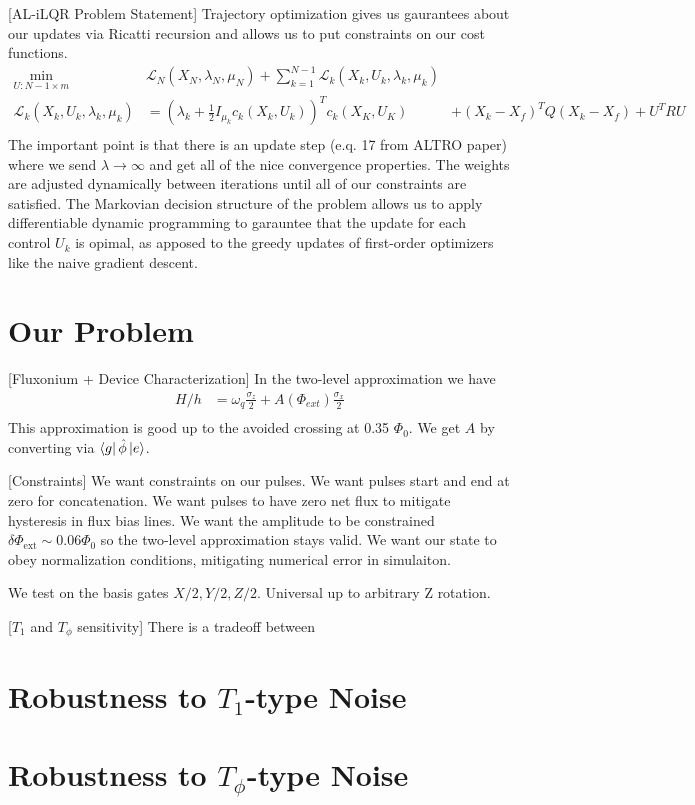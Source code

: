 \documentclass[
  amsfonts,
  amsmath,
  amssymb,
  aps,
  nobibnotes,
  prl,
  twocolumn,
]{revtex4-2}
\begin{document}
[AL-iLQR Problem Statement] Trajectory optimization gives us gaurantees
about our updates via Ricatti recursion
and allows us to put constraints on our cost functions.
\begin{align}
  \min_{U:N-1 \times m} &\mathcal{L}_{N}(X_{N}, \lambda_{N}, \mu_{N}) + \sum_{k = 1}^{N - 1} \mathcal{L}_{k}(X_{k}, U_{k}, \lambda_{k}, \mu_{k})\\
  \mathcal{L}_{k}(X_{k}, U_{k}, \lambda_{k}, \mu_{k}) &= (\lambda_{k} + \frac{1}{2}I_{\mu_{k}} c_{k}(X_{k}, U_{k}))^{T} c_{k}(X_{K}, U_{K})
  &+ (X_{k} - X_{f})^{T} Q (X_{k} - X_{f}) + U^{T} R U\\
\end{align}
The important point is that there is an update step (e.q. 17 from ALTRO paper) where we send $\lambda \rightarrow \infty$
and get all of the nice convergence properties. The weights are adjusted dynamically between iterations until
all of our constraints are satisfied. The Markovian decision structure of the problem allows
us to apply differentiable dynamic programming to garauntee that the update for each control $U_{k}$ is
opimal, as apposed to the greedy updates of first-order optimizers like the naive gradient descent.



\section{Our Problem}
[Fluxonium + Device Characterization] In the two-level
approximation we have
\begin{align}
  H/h &= \omega_{q} \frac{\sigma_{z}}{2} + A(\Phi_{ext}) \frac{\sigma_{x}}{2}\\
\end{align}
This approximation is good up to the avoided crossing at 0.35 $\Phi_{0}$. We get $A$
by converting via $\bra{g} \hat{\phi} \ket{e}$.

[Constraints] We want constraints on our pulses. We want pulses start and end at zero
for concatenation. We want pulses to have zero net flux to mitigate
hysteresis in flux bias lines.
We want the amplitude to be constrained
$\delta \Phi_{\textrm{ext}} \sim 0.06 \Phi_{0}$
so the two-level approximation stays valid.
We want our state to obey normalization conditions,
mitigating numerical error in simulaiton.

We test on the basis gates $X/2, Y/2, Z/2$. Universal
up to arbitrary Z rotation.

[$T_{1}$ and $T_{\phi}$ sensitivity] There is a tradeoff between



\section{Robustness to $T_{1}$-type Noise}



\section{Robustness to $T_{\phi}$-type Noise}


\end{document}
